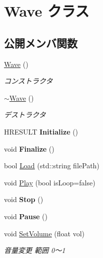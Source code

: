 \hypertarget{class_a_p_i_1_1_wave}{}\section{Wave クラス}
\label{class_a_p_i_1_1_wave}
\subsection*{公開メンバ関数}
\begin{DoxyCompactItemize}
\item 
\hyperlink{class_a_p_i_1_1_wave_a6fdcd896e9bbb4bc7dc1720dacacb1ed}{Wave} ()\hypertarget{class_a_p_i_1_1_wave_a6fdcd896e9bbb4bc7dc1720dacacb1ed}{}\label{class_a_p_i_1_1_wave_a6fdcd896e9bbb4bc7dc1720dacacb1ed}

\begin{DoxyCompactList}\small\item\em コンストラクタ \end{DoxyCompactList}\item 
\hyperlink{class_a_p_i_1_1_wave_a4cecd0f4bf1b520a3a3cddf626bafdcf}{$\sim$\+Wave} ()\hypertarget{class_a_p_i_1_1_wave_a4cecd0f4bf1b520a3a3cddf626bafdcf}{}\label{class_a_p_i_1_1_wave_a4cecd0f4bf1b520a3a3cddf626bafdcf}

\begin{DoxyCompactList}\small\item\em デストラクタ \end{DoxyCompactList}\item 
H\+R\+E\+S\+U\+LT {\bfseries Initialize} ()\hypertarget{class_a_p_i_1_1_wave_a81109341187e54cc3585f29a1306ca50}{}\label{class_a_p_i_1_1_wave_a81109341187e54cc3585f29a1306ca50}

\item 
void {\bfseries Finalize} ()\hypertarget{class_a_p_i_1_1_wave_a8fee61d7a783cade1a3d07fe86284d27}{}\label{class_a_p_i_1_1_wave_a8fee61d7a783cade1a3d07fe86284d27}

\item 
bool \hyperlink{class_a_p_i_1_1_wave_a70c8d413c8d0eeb72c33a58a3d9f2c02}{Load} (std\+::string file\+Path)
\item 
void \hyperlink{class_a_p_i_1_1_wave_a779405cdc18efe68b4c35846defa2278}{Play} (bool is\+Loop=false)
\item 
void {\bfseries Stop} ()\hypertarget{class_a_p_i_1_1_wave_a17a237457e57625296e6b24feb19c60a}{}\label{class_a_p_i_1_1_wave_a17a237457e57625296e6b24feb19c60a}

\item 
void {\bfseries Pause} ()\hypertarget{class_a_p_i_1_1_wave_a70babc5227ddd16ca31dccc6cec0bb22}{}\label{class_a_p_i_1_1_wave_a70babc5227ddd16ca31dccc6cec0bb22}

\item 
void \hyperlink{class_a_p_i_1_1_wave_a29aa2f1ad77425cf3079b275ed1a14c5}{Set\+Volume} (float vol)
\begin{DoxyCompactList}\small\item\em 音量変更  範囲 0〜1 \end{DoxyCompactList}\end{DoxyCompactItemize}
